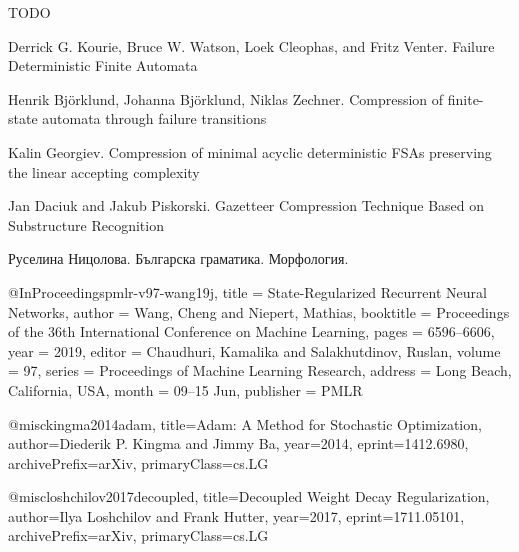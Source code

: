 \documentclass[a4paper,12pt]{article}
\begin{document}
TODO

\pagebreak

\begin{thebibliography}{}

\newblock Derrick G. Kourie, Bruce W. Watson, Loek Cleophas, and Fritz Venter.
\newblock Failure Deterministic Finite Automata

\newblock Henrik Björklund, Johanna Björklund, Niklas Zechner.
\newblock Compression of finite-state automata through failure transitions

\newblock Kalin Georgiev.
\newblock Compression of minimal acyclic deterministic FSAs preserving the linear accepting complexity

\newblock Jan Daciuk and Jakub Piskorski.
\newblock Gazetteer Compression Technique Based on Substructure Recognition

\newblock Руселина Ницолова.
\newblock Българска граматика. Морфология.

@InProceedings{pmlr-v97-wang19j,  
          title = 	 {State-Regularized Recurrent Neural Networks},  
          author = 	 {Wang, Cheng and Niepert, Mathias},  
          booktitle = 	 {Proceedings of the 36th International Conference on Machine Learning},  
          pages = 	 {6596--6606},  
          year = 	 {2019},  
          editor = 	 {Chaudhuri, Kamalika and Salakhutdinov, Ruslan},  
          volume = 	 {97},  
          series = 	 {Proceedings of Machine Learning Research},  
          address = 	 {Long Beach, California, USA},  
          month = 	 {09--15 Jun},  
          publisher = 	 {PMLR}  
        }

@misc{kingma2014adam,
    title={Adam: A Method for Stochastic Optimization},
    author={Diederik P. Kingma and Jimmy Ba},
    year={2014},
    eprint={1412.6980},
    archivePrefix={arXiv},
    primaryClass={cs.LG}
}

@misc{loshchilov2017decoupled,
    title={Decoupled Weight Decay Regularization},
    author={Ilya Loshchilov and Frank Hutter},
    year={2017},
    eprint={1711.05101},
    archivePrefix={arXiv},
    primaryClass={cs.LG}
}

\end{thebibliography}

\pagebreak
\end{document}
